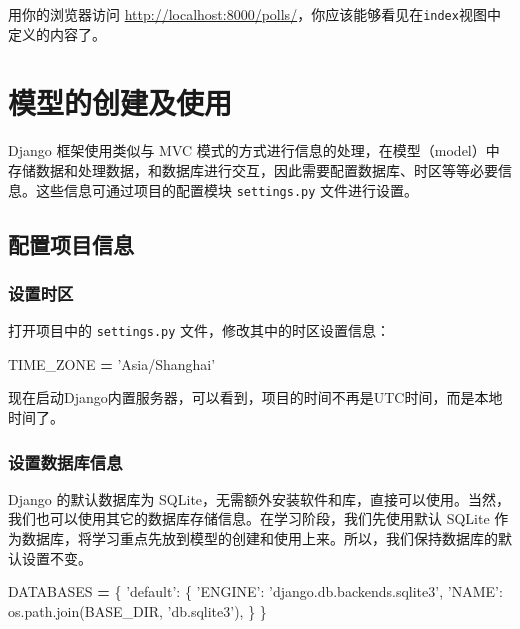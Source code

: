 \documentclass[]{ctexbook}
\newenvironment{Shaded}{\begin{snugshade}}{\end{snugshade}}
\newcommand{\NormalTok}[1]{#1}
\newcommand{\OperatorTok}[1]{\textcolor[rgb]{0.81,0.36,0.00}{\textbf{#1}}}
\newcommand{\StringTok}[1]{\textcolor[rgb]{0.31,0.60,0.02}{#1}}
\begin{document}
用你的浏览器访问 \url{http://localhost:8000/polls/}，你应该能够看见在\texttt{index}视图中定义的内容了。

\hypertarget{ux6a21ux578bux7684ux521bux5efaux53caux4f7fux7528}{%
\section{模型的创建及使用}\label{ux6a21ux578bux7684ux521bux5efaux53caux4f7fux7528}}

Django 框架使用类似与 MVC 模式的方式进行信息的处理，在模型（model）中存储数据和处理数据，和数据库进行交互，因此需要配置数据库、时区等等必要信息。这些信息可通过项目的配置模块 \texttt{settings.py} 文件进行设置。

\hypertarget{ux914dux7f6eux9879ux76eeux4fe1ux606f}{%
\subsection{配置项目信息}\label{ux914dux7f6eux9879ux76eeux4fe1ux606f}}

\hypertarget{ux8bbeux7f6eux65f6ux533a}{%
\subsubsection{设置时区}\label{ux8bbeux7f6eux65f6ux533a}}

打开项目中的 \texttt{settings.py} 文件，修改其中的时区设置信息：

\begin{Shaded}
\begin{Highlighting}[]
\NormalTok{TIME_ZONE }\OperatorTok{=} \StringTok{'Asia/Shanghai'}
\end{Highlighting}
\end{Shaded}

现在启动Django内置服务器，可以看到，项目的时间不再是UTC时间，而是本地时间了。

\hypertarget{ux8bbeux7f6eux6570ux636eux5e93ux4fe1ux606f}{%
\subsubsection{设置数据库信息}\label{ux8bbeux7f6eux6570ux636eux5e93ux4fe1ux606f}}

Django 的默认数据库为 SQLite，无需额外安装软件和库，直接可以使用。当然，我们也可以使用其它的数据库存储信息。在学习阶段，我们先使用默认 SQLite 作为数据库，将学习重点先放到模型的创建和使用上来。所以，我们保持数据库的默认设置不变。

\begin{Shaded}
\begin{Highlighting}[]
\NormalTok{DATABASES }\OperatorTok{=}\NormalTok{ \{}
    \StringTok{'default'}\NormalTok{: \{}
        \StringTok{'ENGINE'}\NormalTok{: }\StringTok{'django.db.backends.sqlite3'}\NormalTok{,}
        \StringTok{'NAME'}\NormalTok{: os.path.join(BASE_DIR, }\StringTok{'db.sqlite3'}\NormalTok{),}
\NormalTok{    \}}
\NormalTok{\}}
\end{Highlighting}
\end{Shaded}
\end{document}
